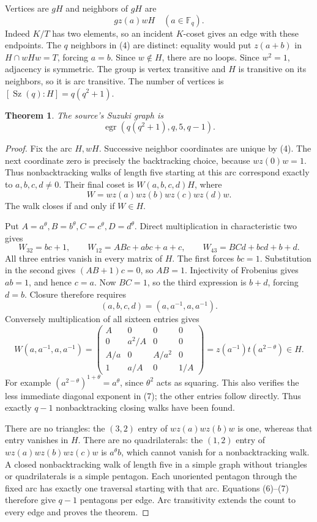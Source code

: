 \documentclass[11pt,a4paper]{article}
\newtheorem{theorem}{Theorem}
\newcommand{\F}{\mathbb F}
\begin{document}
Vertices are $gH$ and neighbors of $gH$ are
\[
                    gz(a)wH\quad(a\in\F_q).              \tag{4}
\]
Indeed $K/T$ has two elements, so an incident $K$-coset gives an
edge with these endpoints. The $q$ neighbors in (4) are distinct:
equality would put $z(a+b)$ in $H\cap wHw=T$, forcing $a=b$.
Since $w\notin H$, there are no loops. Since $w^2=1$, adjacency
is symmetric. The group is vertex transitive and $H$ is transitive
on its neighbors, so it is arc transitive. The number of vertices
is $[\operatorname{Sz}(q):H]=q(q^2+1)$.

\begin{theorem}\label{suzuki}
The source's Suzuki graph is
\[
                  \operatorname{egr}(q(q^2+1),q,5,q-1).
\]
\end{theorem}
\begin{proof}
Fix the arc $H,wH$. Successive neighbor coordinates are unique by
(4). The next coordinate zero is precisely the backtracking choice,
because $wz(0)w=1$. Thus nonbacktracking walks of length five
starting at this arc correspond exactly to $a,b,c,d\ne0$.
Their final coset is $W(a,b,c,d)H$, where
\[
       W=wz(a)wz(b)wz(c)wz(d)w.
\]
The walk closes if and only if $W\in H$.

Put $A=a^\theta,B=b^\theta,C=c^\theta,D=d^\theta$.
Direct multiplication in characteristic two gives
\[
 W_{32}=bc+1,\qquad W_{12}=ABc+abc+a+c,
 \qquad W_{43}=BCd+bcd+b+d.                              \tag{5}
\]
All three entries vanish in every matrix of $H$. The first forces
$bc=1$. Substitution in the second gives $(AB+1)c=0$, so $AB=1$.
Injectivity of Frobenius gives $ab=1$, and hence $c=a$.
Now $BC=1$, so the third expression is $b+d$, forcing $d=b$.
Closure therefore requires
\[
               (a,b,c,d)=(a,a^{-1},a,a^{-1}).             \tag{6}
\]
Conversely multiplication of all sixteen entries gives
\[
 W(a,a^{-1},a,a^{-1})=
 \begin{pmatrix}
 A&0&0&0\\0&a^2/A&0&0\\A/a&0&A/a^2&0\\1&a/A&0&1/A
 \end{pmatrix}
              =z(a^{-1})t(a^{2-\theta})\in H.            \tag{7}
\]
For example $(a^{2-\theta})^{1+\theta}=a^\theta$, since
$\theta^2$ acts as squaring. This also verifies the less immediate
diagonal exponent in (7); the other entries follow directly.
Thus exactly $q-1$ nonbacktracking closing walks have been found.

There are no triangles: the $(3,2)$ entry of
$wz(a)wz(b)w$ is one, whereas that entry vanishes in $H$.
There are no quadrilaterals: the $(1,2)$ entry of
$wz(a)wz(b)wz(c)w$ is $a^\theta b$, which cannot vanish
for a nonbacktracking walk. A closed nonbacktracking walk of length
five in a simple graph without triangles or quadrilaterals is a
simple pentagon. Each unoriented pentagon through the fixed arc
has exactly one traversal starting with that arc. Equations
(6)--(7) therefore give $q-1$ pentagons per edge. Arc transitivity
extends the count to every edge and proves the theorem.
\end{proof}
\end{document}
